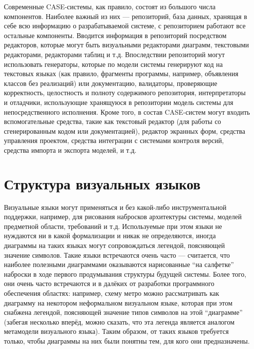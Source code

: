 Современные CASE-системы, как правило, состоят из большого числа компонентов. 
Наиболее важный из них --- репозиторий, база данных, хранящая в себе всю 
информацию о разрабатываемой системе, с репозиторием работают все остальные 
компоненты. Вводится информация в репозиторий посредством редакторов, которые 
могут быть визуальными редакторами диаграмм, текстовыми редакторами, редакторами 
таблиц и т.д. Впоследствии репозиторий могут использовать генераторы, которые по 
модели системы генерируют код на текстовых языках (как правило, фрагменты 
программы, например, объявления классов без реализаций) или документацию, 
валидаторы, проверяющие корректность, целостность и полноту содержимого 
репозитория, интерпретаторы и отладчики, использующие хранящуюся в репозитории 
модель системы для непосредственного исполнения. Кроме того, в состав 
CASE-систем могут входить вспомогательные средства, такие как текстовый редактор 
(для работы со сгенерированным кодом или документацией), редактор экранных форм, 
средства управления проектом, средства интеграции с системами контроля версий, 
средства импорта и экспорта моделей, и т.д.

\section{Структура визуальных языков}
Визуальные языки могут применяться и без какой-либо инструментальной поддержки, 
например, для рисования набросков архитектуры системы, моделей предметной 
области, требований и т.д. Используемые при этом языки не нуждаются ни в какой 
формализации и никак не определяются, иногда диаграммы на таких языках могут 
сопровождаться легендой, поясняющей значение символов. Такие языки встречаются 
очень часто --- считается, что наиболее полезными диаграммами оказываются 
нарисованные "`на салфетке"' наброски в ходе первого продумывания структуры 
будущей системы. Более того, они очень часто встречаются и в далёких от 
разработки программного обеспечения областях: например, схему метро можно 
рассматривать как диаграмму на некотором неформальном визуальном языке, которая 
при этом снабжена легендой, поясняющей значение типов символов на этой 
"`диаграмме"' (забегая несколько вперёд, можно сказать, что эта легенда является 
аналогом метамодели визуального языка). Таким образом, от таких языков требуется 
только, чтобы диаграммы на них были понятны тем, для кого они предназначены.

